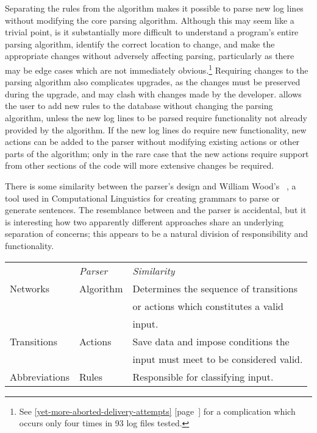 \documentclass[a4paper,12pt,draft]{article}
\newcommand{\parsername}{\PLP{}}
\newcommand{\refwithpage}[1]{%
    \empty{}\ref{#1} [page~\pageref{#1}]%
}
\newcommand{\sectionref}[1]{%
    \textsection{}\refwithpage{#1}%
}
\newcommand{\numberOFlogFILES}[0]{%
    93%
}
\begin{document}
Separating the rules from the algorithm makes it possible to parse new log
lines without modifying the core parsing algorithm.  Although this may seem
like a trivial point, is it substantially more difficult to understand a
program's entire parsing algorithm, identify the correct location to
change, and make the appropriate changes without adversely affecting
parsing, particularly as there may be edge cases which are not immediately
obvious.\footnote{See \sectionref{yet-more-aborted-delivery-attempts} for a
complication which occurs only four times in \numberOFlogFILES{} log files
tested.} Requiring changes to the parsing algorithm also complicates
upgrades, as the changes must be preserved during the upgrade, and may
clash with changes made by the developer.  \parsername{} allows the user to
add new rules to the database without changing the parsing algorithm,
unless the new log lines to be parsed require functionality not already
provided by the algorithm.  If the new log lines do require new
functionality, new actions can be added to the parser without modifying
existing actions or other parts of the algorithm; only in the rare case
that the new actions require support from other sections of the code will
more extensive changes be required.

There is some similarity between the parser's design and William Wood's
\ATN{}~\cite{atns, nlpip}, a tool used in Computational Linguistics for
creating grammars to parse or generate sentences.  The resemblance between
\ATN{} and the parser is accidental, but it is interesting how two
apparently different approaches share an underlying separation of concerns;
this appears to be a natural division of responsibility and functionality.


\begin{tabular}[]{lll}
    \textit{\ATN{}\/}   & \textit{Parser\/} & \textit{Similarity\/}     \\
    Networks            & Algorithm         & Determines the sequence 
                                              of transitions            \\
                        &                   & or actions which 
                                              constitutes a valid       \\
                        &                   & input.                    \\
    Transitions         & Actions           & Save data and impose
                                              conditions the            \\
                        &                   & input must meet to be
                                              considered valid.         \\
    Abbreviations       & Rules             & Responsible for 
                                              classifying input.        \\
\end{tabular}
\end{document}
